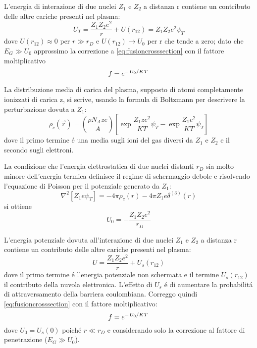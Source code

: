 \documentclass[../main.tex]{subfiles}
\begin{document}
\begin{errata}[Salpeter 1954]
L'energia di interazione di due nuclei $Z_1$ e $Z_2$ a distanza r contiene un contributo delle altre cariche presenti nel plasma:
\begin{equation}
U_T=\frac{Z_1Z_2e^2}{r}+U(r_{12})=Z_1Z_2e^2\psi_T
\end{equation}
dove $U(r_{12})\approx0$ per $r\gg r_D$ e $U(r_{12})\to U_0$ per r che tende a zero; dato che $E_G\gg U_0$ approssimo la correzione a \eqref{eq:fusioncrosssection} con il fattore moltiplicativo
\begin{equation}
f=e^{-\left.{U_0}\middle/{KT}\right.}\label{eq:screeningfactor}
\end{equation}

La distribuzione media di carica del plasma, supposto di atomi completamente ionizzati di carica z, si scrive, usando la formula di Boltzmann per descrivere la perturbazione dovuta a $Z_1$:
\begin{equation}
\rho_c(\vec{r})=(\frac{\rho N_Aze}{A})[\exp{\frac{Z_1ze^2}{KT}\psi_T}-\exp{\frac{Z_1e^2}{KT}\psi_T}]
\end{equation}
dove il primo termine \'e una media sugli ioni del gas diversi da $Z_1$ e $Z_2$  e il secondo sugli elettroni.

La condizione che l'energia elettrostatica di due nuclei distanti $r_D$ sia molto minore dell'energia termica definisce il regime di schermaggio debole e risolvendo l'equazione di Poisson per il potenziale generato da $Z_1$: 
\begin{equation}
\nabla^2[Z_1e\psi_T]=-4\pi\rho_c(r)-4\pi Z_1e\delta^{(3)}(r)
\end{equation}
si ottiene
\begin{equation}
U_0=-\frac{Z_1Z_2e^2}{r_D}
\end{equation}

\end{errata}

L'energia potenziale dovuta all'interazione di due nuclei $Z_1$ e $Z_2$ a distanza r contiene un contributo delle altre cariche presenti nel plasma:
\begin{equation}
U=\frac{Z_1Z_2e^2}{r}+U_s(r_{12})
\end{equation}
dove il primo termine \'e l'energia potenziale non schermata e il termine $U_s(r_{12})$ il contributo della nuvola elettronica. L'effetto di $U_s$ \'e di aumentare la probabilit\'a di attraversamento della barriera coulombiana. Correggo quindi \eqref{eq:fusioncrosssection} con il fattore moltiplicativo:
\begin{equation}
f=e^{-\left.{U_0}\middle/{KT}\right.}\label{eq:screeningfactor}
\end{equation}
dove $U_0=U_s(0)$ poich\'e $r\ll r_D$ e considerando solo la correzione al fattore di penetrazione ($E_G\gg U_0$).
\end{document}
